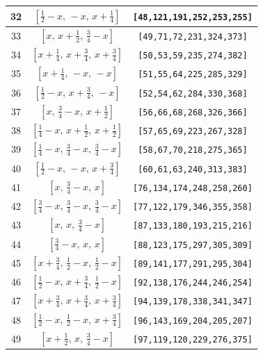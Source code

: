 \documentclass[fleqn,8pt]{jsarticle}
\begin{document}
\begin{longtable}{ccc}
32 & $\left[ \frac{1}{2} - x,\, - x,\, x + \frac{1}{4} \right]$ & {\tt [48,121,191,252,253,255]} \\ \hline
33 & $\left[ x,\, x + \frac{1}{2},\, \frac{3}{4} - x \right]$ & {\tt [49,71,72,231,324,373]} \\ \hline
34 & $\left[ x + \frac{1}{4},\, x + \frac{3}{4},\, x + \frac{3}{4} \right]$ & {\tt [50,53,59,235,274,382]} \\ \hline
35 & $\left[ x + \frac{1}{4},\, - x,\, - x \right]$ & {\tt [51,55,64,225,285,329]} \\ \hline
36 & $\left[ \frac{1}{2} - x,\, x + \frac{3}{4},\, - x \right]$ & {\tt [52,54,62,284,330,368]} \\ \hline
37 & $\left[ x,\, \frac{3}{4} - x,\, x + \frac{1}{2} \right]$ & {\tt [56,66,68,268,326,366]} \\ \hline
38 & $\left[ \frac{1}{4} - x,\, x + \frac{1}{2},\, x + \frac{1}{2} \right]$ & {\tt [57,65,69,223,267,328]} \\ \hline
39 & $\left[ \frac{1}{4} - x,\, \frac{3}{4} - x,\, \frac{3}{4} - x \right]$ & {\tt [58,67,70,218,275,365]} \\ \hline
40 & $\left[ \frac{1}{2} - x,\, - x,\, x + \frac{3}{4} \right]$ & {\tt [60,61,63,240,313,383]} \\ \hline
41 & $\left[ x,\, \frac{3}{4} - x,\, x \right]$ & {\tt [76,134,174,248,258,260]} \\ \hline
42 & $\left[ \frac{3}{4} - x,\, \frac{3}{4} - x,\, \frac{3}{4} - x \right]$ & {\tt [77,122,179,346,355,358]} \\ \hline
43 & $\left[ x,\, x,\, \frac{3}{4} - x \right]$ & {\tt [87,133,180,193,215,216]} \\ \hline
44 & $\left[ \frac{3}{4} - x,\, x,\, x \right]$ & {\tt [88,123,175,297,305,309]} \\ \hline
45 & $\left[ x + \frac{3}{4},\, \frac{1}{2} - x,\, \frac{1}{2} - x \right]$ & {\tt [89,141,177,291,295,304]} \\ \hline
46 & $\left[ \frac{1}{2} - x,\, x + \frac{3}{4},\, \frac{1}{2} - x \right]$ & {\tt [92,138,176,244,246,254]} \\ \hline
47 & $\left[ x + \frac{3}{4},\, x + \frac{3}{4},\, x + \frac{3}{4} \right]$ & {\tt [94,139,178,338,341,347]} \\ \hline
48 & $\left[ \frac{1}{2} - x,\, \frac{1}{2} - x,\, x + \frac{3}{4} \right]$ & {\tt [96,143,169,204,205,207]} \\ \hline
49 & $\left[ x + \frac{1}{2},\, x,\, \frac{3}{4} - x \right]$ & {\tt [97,119,120,229,276,375]} \\ \hline

\end{longtable}
\end{document}
